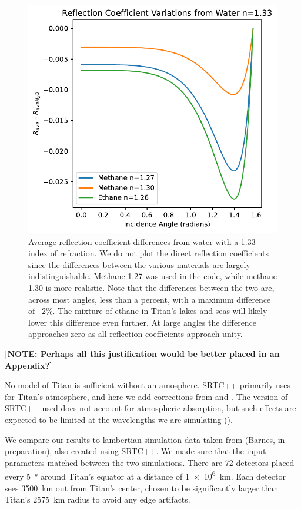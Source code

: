 \documentclass{article}
\begin{document}
\begin{figure}[htbp]
\includegraphics[scale = 0.5]{ReflectionVariations.pdf}
\centering
\caption{Average reflection coefficient differences from water with a 1.33 index of refraction. We do not plot the direct reflection coefficients since the differences between the various materials are largely indistinguishable. Methane 1.27 was used in the code, while methane 1.30 is more realistic. Note that the differences between the two are, across most angles, less than a percent, with a maximum difference of ~2\%. The mixture of ethane in Titan's lakes and seas will likely lower this difference even further. At large angles the difference approaches zero as all reflection coefficients approach unity.}
\label{fig:4}
\end{figure}

\textbf{\color{red} [NOTE: Perhaps all this justification would be better placed in an Appendix?] \color{black}}

No model of Titan is sufficient without an amosphere. SRTC++ primarily uses \cite{Tomasko2008} for Titan's atmosphere, and here we add corrections from \cite{Hirtzig2013} and \cite{Rodriguez2018}. The version of SRTC++ used does not account for atmospheric absorption, but such effects are expected to be limited at the wavelengths we are simulating (\cite{EsSayeh2023}).

We compare our results to lambertian simulation data taken from (Barnes, in preparation), also created using SRTC++. We made sure that the input parameters matched between the two simulations. There are 72 detectors placed every \qty{5}{\degree} around Titan's equator at a distance of \qty{1e6}{\kilo\meter}. Each detector sees \qty{3500}{\kilo\meter} out from Titan's center, chosen to be significantly larger than Titan's \qty{2575}{\kilo\meter} radius to avoid any edge artifacts. 
\end{document}
